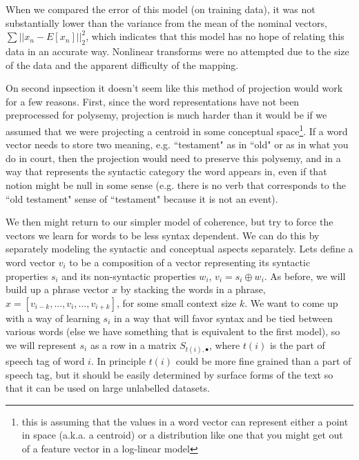 \documentclass[11pt,letterpaper]{article}
\begin{document}
When we compared the error of this model (on training data), it
was not substantially lower than the variance from the mean of the nominal vectors,
$\sum ||x_n - E[x_n]||_2^2$, which indicates that this model has no hope
of relating this data in an accurate way. Nonlinear transforms were no attempted
due to the size of the data and the apparent difficulty of the mapping.


On second inpsection it doesn't seem like this method of projection would work for a few reasons.
First, since the word representations have not been preprocessed for polysemy, projection is much harder than
it would be if we assumed that we were projecting a centroid in some conceptual space\footnote{this
is assuming that the values in a word vector can represent either a point in space (a.k.a. a centroid)
or a distribution like one that you might get out of a feature vector in a log-linear model}.
If a word vector needs to store two meaning, e.g. ``testament" as in ``old" or as in what you do in court,
then the projection would need to preserve this polysemy, and in a way that represents the
syntactic category the word appears in, even if that notion might be null in some sense
(e.g. there is no verb that corresponds to the ``old testament" sense of ``testament" because it is not an event).


We then might return to our simpler model of coherence,
but try to force the vectors we learn for words to be less syntax dependent.
We can do this by separately modeling the syntactic and conceptual aspects separately.
Lets define a word vector $v_i$ to be a composition of a vector representing its
syntactic properties $s_i$ and its non-syntactic properties $w_i$, $v_i = s_i \oplus w_i$.
As before, we will build up a phrase vector $x$ by stacking the words in a phrase,
$x = [v_{i-k}, ..., v_i, ..., v_{i+k}]$, for some small context size $k$.
We want to come up with a way of learning $s_i$ in a way that will favor syntax and
be tied between various words (else we have something that is equivalent to the first model),
so we will represent $s_i$ as a row in a matrix $S_{t(i),\bullet}$,
where $t(i)$ is the part of speech tag of word $i$. In principle $t(i)$ could be more
fine grained than a part of speech tag, but it should be easily determined by surface
forms of the text so that it can be used on large unlabelled datasets.
\end{document}
